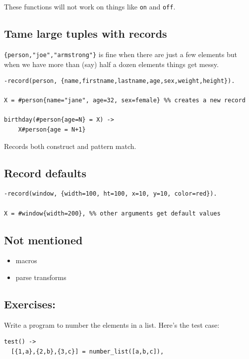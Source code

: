 \documentclass[12pt]{article}
\begin{document}
These functions will not work on things like \verb+on+ and \verb+off+.

\subsection{Tame large tuples with records}

\verb+{person,"joe","armstrong"}+ is fine when there are just a few
elements but when we have more than (say) half a dozen elements things
get messy.

\begin{verbatim}
-record(person, {name,firstname,lastname,age,sex,weight,height}).

X = #person{name="jane", age=32, sex=female} %% creates a new record

birthday(#person{age=N} = X) ->
    X#person{age = N+1}
\end{verbatim}

Records both construct and pattern match.

\subsection{Record defaults}

\begin{verbatim}
-record(window, {width=100, ht=100, x=10, y=10, color=red}).

X = #window{width=200}, %% other arguments get default values
\end{verbatim}

\subsection{Not mentioned}

\begin{itemize}
\item macros

\item parse transforms
\end{itemize}

\subsection{Exercises: }

Write a program to number the elements in a list.
Here's the test case:

\begin{verbatim}
test() ->
  [{1,a},{2,b},{3,c}] = number_list([a,b,c]),
\end{verbatim}
\end{document}
